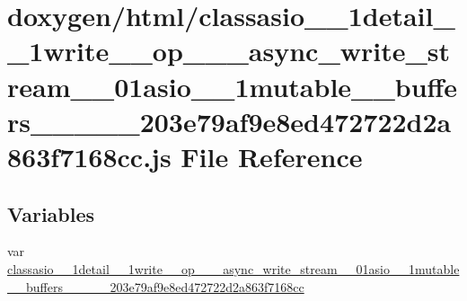 \hypertarget{classasio__1__1detail__1__1write____op__3__01__async__write__stream__00__01asio__1__1mutable____a81dbff3122095366851197319b54fd7}{}\section{doxygen/html/classasio\+\_\+\_\+1detail\+\_\+\_\+1write\+\_\+\+\_\+op\+\_\+\_\+\_\+async\+\_\+write\+\_\+stream\+\_\+\_\+01asio\+\_\+\_\+1mutable\+\_\+\+\_\+buffers\+\_\+\+\_\+\_\+\_\+\_\+203e79af9e8ed472722d2a863f7168cc.js File Reference}
\label{classasio__1__1detail__1__1write____op__3__01__async__write__stream__00__01asio__1__1mutable____a81dbff3122095366851197319b54fd7}
\subsection*{Variables}
\begin{DoxyCompactItemize}
\item 
var \hyperlink{classasio__1__1detail__1__1write____op__3__01__async__write__stream__00__01asio__1__1mutable____a81dbff3122095366851197319b54fd7_a3e2932a1238e68ced6de146cba5a8d70}{classasio\+\_\+\_\+1detail\+\_\+\_\+1write\+\_\+\+\_\+op\+\_\+\_\+\_\+async\+\_\+write\+\_\+stream\+\_\+\_\+01asio\+\_\+\_\+1mutable\+\_\+\+\_\+buffers\+\_\+\+\_\+\_\+\_\+\_\+203e79af9e8ed472722d2a863f7168cc}
\end{DoxyCompactItemize}


